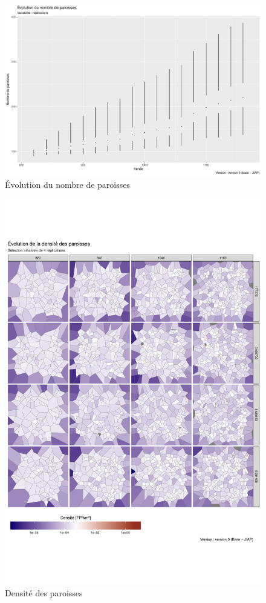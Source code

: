 
\begin{figure}[H]
\captionsetup{width=\linewidth}
\includegraphics[width=0.75\linewidth]{img/resultats/v0_nombre_paroisses.pdf}
\caption{Évolution du nombre de paroisses}
\label{fig:nb-paroisses-v0}
\end{figure}

\begin{figure}[H]
\captionsetup{width=\linewidth}
\includegraphics[width=0.8\linewidth]{img/resultats/v0_paroisses_densite.pdf}
\caption{Densité des paroisses}
\label{fig:densite-paroisses-v0}
\end{figure}


